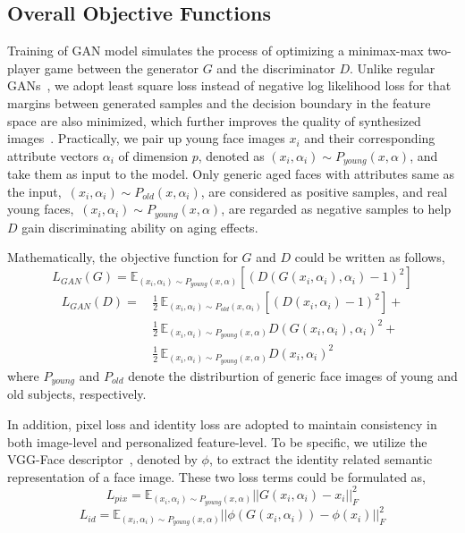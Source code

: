 \documentclass[10pt,twocolumn,letterpaper]{article}
\begin{document}
\subsection{Overall Objective Functions}

Training of GAN model simulates the process of optimizing a minimax-max two-player game between the generator $G$ and the discriminator $D$. 
Unlike regular GANs~\cite{goodfellow2014generative}, we adopt least square loss instead of negative log likelihood loss for that margins between generated samples and the decision boundary in the feature space are also minimized, which further improves the quality of synthesized images~\cite{mao2017least}. 
Practically, we pair up young face images $x_i$ and their corresponding attribute vectors $\alpha_i$ of dimension $p$, denoted as $(x_i, \alpha_i)\sim P_{young}(x, \alpha)$, and take them as input to the model. 
Only generic aged faces with attributes same as the input,~\ie $(x_i, \alpha_i)\sim P_{old}(x, \alpha_i)$, are considered as positive samples, and real young faces,~\ie $(x_i, \alpha_i)\sim P_{young}(x, \alpha)$, are regarded as negative samples to help $D$ gain discriminating ability on aging effects.

Mathematically, the objective function for $G$ and $D$ could be written as follows,
\begin{equation}
L_{GAN}(G)=\mathbb{E}_{(x_i, \alpha_i)\sim P_{young}(x, \alpha)}[(D(G(x_i, \alpha_i), \alpha_i)-1)^2]
\end{equation}
\begin{equation}
\begin{split}
L_{GAN}(D)=&\,\frac{1}{2}\,\mathbb{E}_{(x_i, \alpha_i)\sim P_{old}(x, \alpha_i)}[(D(x_i, \alpha_i)-1)^2]+\\
      &\,\frac{1}{2}\,\mathbb{E}_{(x_i, \alpha_i)\sim P_{young}(x, \alpha)}D(G(x_i, \alpha_i), \alpha_i)^2+\\
      &\,\frac{1}{2}\,\mathbb{E}_{(x_i, \alpha_i)\sim P_{young}(x, \alpha)}D(x_i, \alpha_i)^2
\end{split}
\end{equation}
where $P_{young}$ and $P_{old}$ denote the distriburtion of generic face images of young and old subjects, respectively. 

In addition, pixel loss and identity loss are adopted to maintain consistency in both image-level and personalized feature-level. 
To be specific, we utilize the VGG-Face descriptor~\cite{parkhi2015deep}, denoted by $\phi$, to extract the identity related semantic representation of a face image. These two loss terms could be formulated as,
\begin{equation}
L_{pix}=\mathbb{E}_{(x_i, \alpha_i)\sim P_{young}(x, \alpha)}||G(x_i, \alpha_i)-x_i||_F^2
\end{equation}
\begin{equation}
L_{id}=\mathbb{E}_{(x_i, \alpha_i)\sim P_{young}(x, \alpha)}||\phi(G(x_i, \alpha_i))-\phi(x_i)||_F^2
\end{equation}
\end{document}
